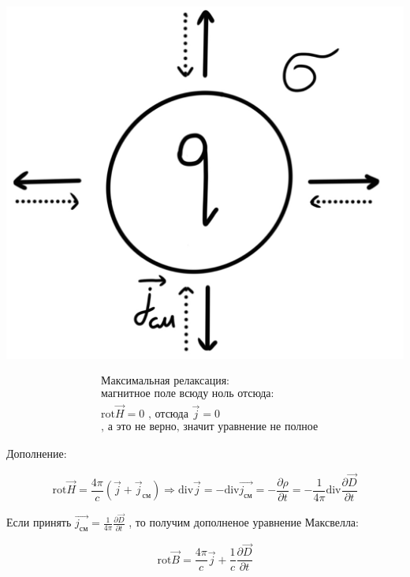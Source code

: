 \begin{minipage}[c]{0.3\textwidth} %
    \includegraphics[width=\textwidth]{im/89.png}%
\end{minipage}%
\hfill
\begin{minipage}[c]{0.6\textwidth} %
\[
\begin{aligned}
&\text{Максимальная релаксация:} \\
&\text{магнитное поле всюду ноль отсюда}:\\
&\mathrm{rot}\vec{H}=0 \text{ , отсюда } \vec{j}=0 \\
&\text{, а это не верно, значит уравнение не полное}
\end{aligned}
\]
\end{minipage}

Дополнение:

\[
\mathrm{rot}\vec{H}=\frac{4\pi}{c}\left( \vec{j}+\vec{j}_{\text{см}} \right)\Rightarrow \mathrm{div}\vec{j}=-\mathrm{div}\vec{j_{\text{см}}}=-\frac{\partial\rho}{\partial t}=-\frac{1}{4\pi}\mathrm{div} \frac{\partial \vec{D}}{\partial t}        
\]

Если принять \( \vec{j_{\text{см}}}=\frac{1}{4\pi}\frac{\partial \vec{D}}{\partial t}     \) , то получим дополненое уравнение Максвелла:

\[
\boxed{\mathrm{rot}\vec{B}=\frac{4\pi}{c}\vec{j}+\frac{1}{c} \frac{\partial\vec{D}}{\partial t}    }
\]

